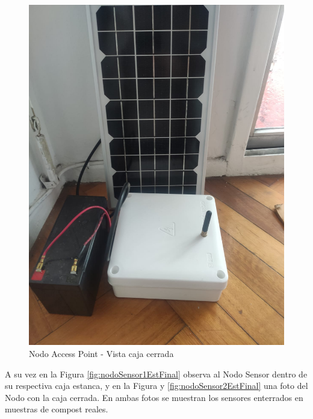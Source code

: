 \begin{figure}[H]
	\centering
	\includegraphics[scale=0.25]{Figures/Pruebas/nodoAP2.jpeg}
	\caption{Nodo Access Point - Vista caja cerrada}
	\label{fig:nodoap2EstrFinal}
\end{figure}

A su vez en la Figura \ref{fig:nodoSensor1EstFinal} observa al Nodo Sensor dentro de su respectiva caja estanca, y en la Figura y \ref{fig:nodoSensor2EstFinal} una foto del Nodo con la caja cerrada. En ambas fotos se muestran los sensores enterrados en muestras de compost reales.

